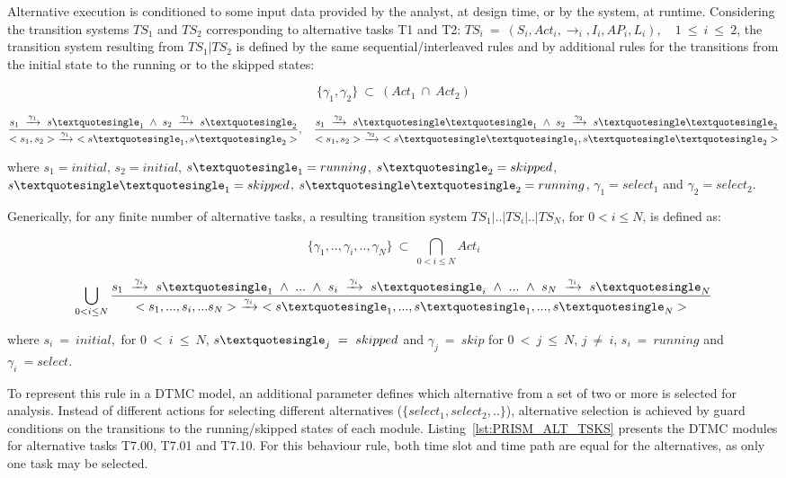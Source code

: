 Alternative execution is conditioned to some input data provided by the analyst, at design time, or by the system, at runtime. Considering the transition systems $TS_1$ and $TS_2$ corresponding to alternative tasks T1 and T2: $TS_i\ =\ (S_i, Act_i, \rightarrow_i, I_i, AP_i, L_i),\quad 1\ \leq\ i\ \leq\ 2$, the transition system resulting from $TS_1|TS_2$ is defined by the same sequential/interleaved rules and by additional rules for the transitions from the initial state to the running or to the skipped states: 

$$\{\gamma_1, \gamma_2\}\ \subset\ (Act_1\ \cap\ Act_2)$$

$$\frac{s_1\ \xrightarrow{\gamma_1}\ s\textquotesingle_1\ \wedge\ s_2\ \xrightarrow{\gamma_1}\ s\textquotesingle_2}{<s_1,s_2>\ \xrightarrow{\gamma_1}\ <s\textquotesingle_1, s\textquotesingle_2>},\quad \frac{s_1\ \xrightarrow{\gamma_2}\ s\textquotesingle\textquotesingle_1\ \wedge\ s_2\ \xrightarrow{\gamma_2}\ s\textquotesingle\textquotesingle_2}{<s_1,s_2>\ \xrightarrow{\gamma_2}\ <s\textquotesingle\textquotesingle_1, s\textquotesingle\textquotesingle_2>}$$
\medskip

\noindent
where $s_1 = initial$, $s_2 = initial$, $s\textquotesingle_1 = running$, $s\textquotesingle_2 = skipped$, $s\textquotesingle\textquotesingle_1 = skipped$, $s\textquotesingle\textquotesingle_2 = running$, $\gamma_1 = select_1$ and $\gamma_2 = select_2$. 
\medskip

Generically, for any finite number of alternative tasks, a resulting transition system $TS_1|..|TS_i|..|TS_N$, for $0 < i \leq N$, is defined as:

$$\{\gamma_1,..,\gamma_i,..,\gamma_N\}\ \subset\ \bigcap_{0 < i \leq N} Act_i$$

$$\bigcup_{0 < i \leq N} \frac{s_1\ \xrightarrow{\gamma_i}\ s\textquotesingle_1\ \wedge\ ...\ \wedge\ s_i\ \xrightarrow{\gamma_i}\ s\textquotesingle_i\ \wedge\ ...\ \wedge\ s_N\ \xrightarrow{\gamma_i}\ s\textquotesingle_N}{<s_1,...,s_i,...s_N>\ \xrightarrow{\gamma_i}\ <s\textquotesingle_1, ..., s\textquotesingle_1, ..., s\textquotesingle_N>}$$
\medskip

\noindent
where $s_i\ =\ initial,$ for $0\ <\ i\ \leq\ N$, $s\textquotesingle_j\ =\ skipped$ and $\gamma_j\ =\ skip$ for $0\ <\ j\ \leq\ N$, $j\ \neq\ i$, $s_i\ =\ running$ and $\gamma_i\ = select$.
\bigskip

To represent this rule in a DTMC model, an additional parameter  defines which alternative from a set of two or more is selected for analysis. Instead of different actions for selecting different alternatives ($\{select_1, select_2,..\}$), alternative selection is achieved by guard conditions on the transitions to the running/skipped states of each module. Listing~\ref{lst:PRISM_ALT_TSKS} presents the DTMC modules for alternative tasks T7.00, T7.01 and T7.10. For this behaviour rule, both time slot and time path are equal for the alternatives, as only one task may be selected.
\medskip

